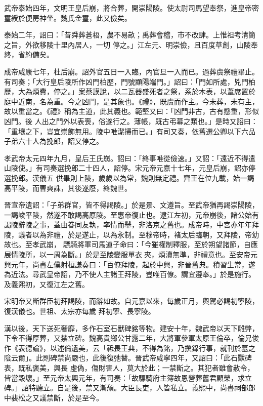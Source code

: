 \begin{pinyinscope}
 武帝泰始四年，文明王皇后崩，將合葬，開崇陽陵。使太尉司馬望奉祭，進皇帝密璽綬於便房神坐。魏氏金璽，此又儉矣。



 泰始二年，詔曰：「昔舜葬蒼梧，農不易畝；禹葬會稽，市不改肆。上惟祖考清簡之旨，外欲移陵十里內居人，一切
 停之。」江左元、明崇儉，且百度草創，山陵奉終，省約備矣。



 成帝咸康七年，杜后崩。詔外官五日一入臨，內官旦一入而已。過葬虞祭禮畢止。有司奏；「大行皇后陵所作凶門柏歷，門號顯陽端門。」詔曰：「門如所處，兇門柏歷，大為煩費，停之。」案蔡謨說，以二瓦器盛死者之祭，系於木表，以葦席置於庭中近南，名為重。今之凶門，是其象也。《禮》，既虞而作主。今未葬，未有主，故以重當之。《禮》稱為主道，此其義也。範堅又曰：「凶門非古，古有懸重，形似凶門。後
 人出之門外以表喪，俗遂行之。薄帳，既古弔幕之類也。」是時又詔曰：「重壤之下，豈宜崇飾無用。陵中唯潔掃而已。」有司又奏，依舊選公卿以下六品子弟六十人為挽郎，詔又停之。



 孝武帝太元四年九月，皇后王氏崩。詔曰：「終事唯從儉速。」又詔：「遠近不得遣山陵使。」有司奏選挽郎二十四人，詔停。宋元帝元嘉十七年，元皇后崩，詔亦停選挽郎。漢儀五
 供畢則上陵，歲歲以為常，魏則無定禮。齊王在位九載，始一謁高平陵，而曹爽誅，其後遂廢，終魏世。



 晉宣帝遺詔：「子弟群官，皆不得謁陵。」於是景、文遵旨。至武帝猶再謁崇陽陵，一謁峻平陵，然遂不敢謁高原陵。至惠帝復止也。逮江左初，元帝崩後，諸公始有謁陵辭陵之事，蓋由眷同友執，率情而舉，非洛京之舊也。成帝時，中宮亦年年拜陵，議者以為非禮，於是遂止，以為永制。至穆帝時，褚太后臨朝，又拜陵，帝幼故也。至孝武崩，
 驃騎將軍司馬道子命曰：「今雖權制釋服，至於朔望諸節，自應展情陵所，以一周為斷。」於是至陵變服單衣夾，煩瀆無準，非禮意也。至安帝元興元年，尚書左僕射桓謙奏曰：「百僚拜陵，起於中興，非晉舊典。積習生常，遂為近法。尋武皇帝詔，乃不使人主諸王拜陵，豈唯百僚。謂宜遵奉。」於是施行。及義熙初，又復江左之舊。



 宋明帝又斷群臣初拜謁陵，而辭如故。自元嘉以來，每歲正月，輿駕必謁初寧陵，復漢儀也。世祖、太宗亦每歲
 拜初寧、長寧陵。



 漢以後，天下送死奢靡，多作石室石獸碑銘等物。建安十年，魏武帝以天下雕弊，下令不得厚葬，又禁立碑。魏高貴鄉公甘露二年，大將軍參軍太原王倫卒，倫兄俊作《表德論》，以述倫遺美，云「祗畏王典，不得為銘，乃撰錄行事，就刊於墓之陰云爾」。此則碑禁尚嚴也，此後復弛替。晉武帝咸寧四年，又詔曰：「此石獸碑表，既私褒美，興長
 虛偽，傷財害人，莫大於此；一禁斷之。其犯者雖會赦令，皆當毀壞。」至元帝太興元年，有司奏：「故驃騎府主簿故恩營葬舊君顧榮，求立碑。」詔特聽立。自是後，禁又漸頹。大臣長吏，人皆私立。義熙中，尚書祠部郎中裴松之又議禁斷，於是至今。




\end{pinyinscope}
